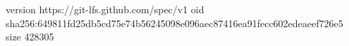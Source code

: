 version https://git-lfs.github.com/spec/v1
oid sha256:649811fd25db5cd75e74b56245098e096aec87416ea91fecc602edeaeef726e5
size 428305
